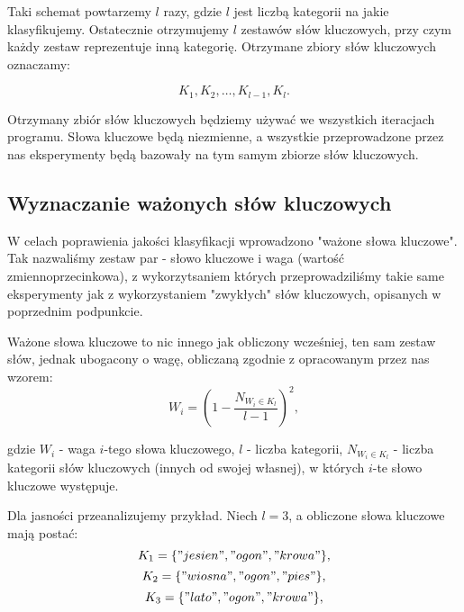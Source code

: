\documentclass{classrep}
\begin{document}
Taki schemat powtarzemy $l$ razy, gdzie $l$ jest liczbą kategorii na jakie klasyfikujemy. Ostatecznie otrzymujemy $l$ zestawów słów kluczowych, przy czym każdy zestaw reprezentuje inną kategorię. Otrzymane zbiory słów kluczowych oznaczamy:

\begin{equation}
            K_{1}, K_{2}, \ldots , K_{l-1}, K_{l}.
 \end{equation}	

Otrzymany zbiór słów kluczowych będziemy używać we wszystkich iteracjach programu. Słowa kluczowe będą niezmienne, a wszystkie przeprowadzone przez nas eksperymenty będą bazowały na tym samym zbiorze słów kluczowych.

\subsection{Wyznaczanie ważonych słów kluczowych}

W celach poprawienia jakości klasyfikacji wprowadzono "ważone słowa kluczowe". Tak nazwaliśmy zestaw par - słowo kluczowe i waga (wartość zmiennoprzecinkowa), z wykorzytsaniem których przeprowadziliśmy takie same eksperymenty jak z wykorzystaniem "zwykłych" słów kluczowych, opisanych w poprzednim podpunkcie. \newline

Ważone słowa kluczowe to nic innego jak obliczony wcześniej, ten sam zestaw słów, jednak ubogacony o wagę, obliczaną zgodnie z opracowanym przez nas wzorem:
\begin{equation}
            W_{i} = \left({1 - \frac{N_{W_{i} \in K_{l}}}{l - 1}}\right)^2,
 \end{equation}	

gdzie $W_{i}$ - waga $i$-tego słowa kluczowego, $l$ - liczba kategorii, $N_{W_{i} \in K_{l}}$ - liczba kategorii słów kluczowych (innych od swojej własnej), w których $i$-te słowo kluczowe występuje. \newline

Dla jasności przeanalizujemy przykład. Niech $l = 3$, a obliczone słowa kluczowe mają postać:\newline
\begin{equation}
            K_{1} = \{{"jesien", "ogon", "krowa"}\},
\end{equation}
\begin{equation}
            K_{2} =\{{"wiosna", "ogon", "pies"}\},
\end{equation}	
\begin{equation}
            K_{3} = \{{"lato", "ogon", "krowa"}\},
\end{equation}	
\end{document}

